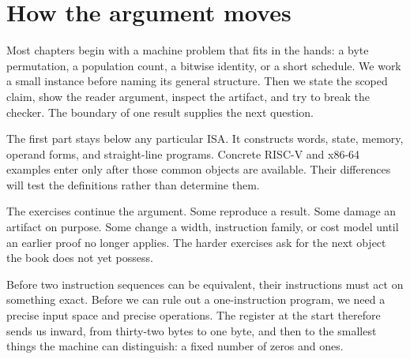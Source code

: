 \section{How the argument moves}
\label{sec:intro-reading}

Most chapters begin with a machine problem that fits in the hands: a byte
permutation, a population count, a bitwise identity, or a short schedule. We
work a small instance before naming its general structure. Then we state the
scoped claim, show the reader argument, inspect the artifact, and try to break
the checker. The boundary of one result supplies the next question.

The first part stays below any particular ISA. It constructs words, state,
memory, operand forms, and straight-line programs. Concrete RISC-V and x86-64
examples enter only after those common objects are available. Their
differences will test the definitions rather than determine them.

The exercises continue the argument. Some reproduce a result. Some damage an
artifact on purpose. Some change a width, instruction family, or cost model
until an earlier proof no longer applies. The harder exercises ask for the
next object the book does not yet possess.

Before two instruction sequences can be equivalent, their instructions must
act on something exact. Before we can rule out a one-instruction program, we
need a precise input space and precise operations. The register at the start
therefore sends us inward, from thirty-two bytes to one byte, and then to the
smallest things the machine can distinguish: a fixed number of zeros and
ones.
